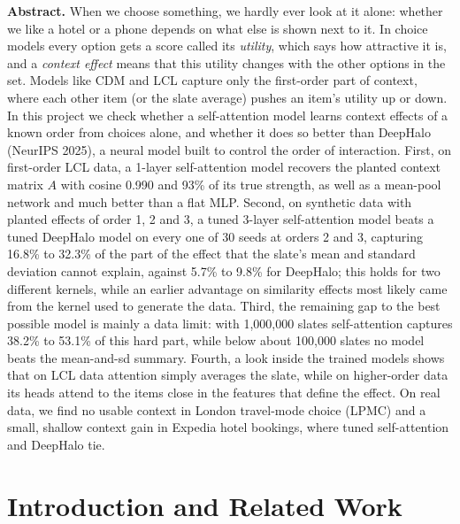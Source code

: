 \documentclass[11pt,a4paper]{article}
\numberwithin{table}{section}
\numberwithin{figure}{section}
\numberwithin{equation}{section}
\begin{document}
\begin{titlepage}
\begin{minipage}{0.92\textwidth}
\textbf{Abstract.} When we choose something, we hardly ever look at it alone: whether we like a hotel or a phone depends on what else is shown next to it. In choice models every option gets a score called its \emph{utility}, which says how attractive it is, and a \emph{context effect} means that this utility changes with the other options in the set. Models like CDM and LCL capture only the first-order part of context, where each other item (or the slate average) pushes an item's utility up or down. In this project we check whether a self-attention model learns context effects of a known order from choices alone, and whether it does so better than DeepHalo (NeurIPS 2025), a neural model built to control the order of interaction. First, on first-order LCL data, a 1-layer self-attention model recovers the planted context matrix $A$ with cosine 0.990 and 93\% of its true strength, as well as a mean-pool network and much better than a flat MLP. Second, on synthetic data with planted effects of order 1, 2 and 3, a tuned 3-layer self-attention model beats a tuned DeepHalo model on every one of 30 seeds at orders 2 and 3, capturing 16.8\% to 32.3\% of the part of the effect that the slate's mean and standard deviation cannot explain, against 5.7\% to 9.8\% for DeepHalo; this holds for two different kernels, while an earlier advantage on similarity effects most likely came from the kernel used to generate the data. Third, the remaining gap to the best possible model is mainly a data limit: with 1,000,000 slates self-attention captures 38.2\% to 53.1\% of this hard part, while below about 100,000 slates no model beats the mean-and-sd summary. Fourth, a look inside the trained models shows that on LCL data attention simply averages the slate, while on higher-order data its heads attend to the items close in the features that define the effect. On real data, we find no usable context in London travel-mode choice (LPMC) and a small, shallow context gain in Expedia hotel bookings, where tuned self-attention and DeepHalo tie.
\end{minipage}
\end{titlepage}

\tableofcontents\thispagestyle{plain}
\clearpage
{}

\section{Introduction and Related Work}
\end{document}
